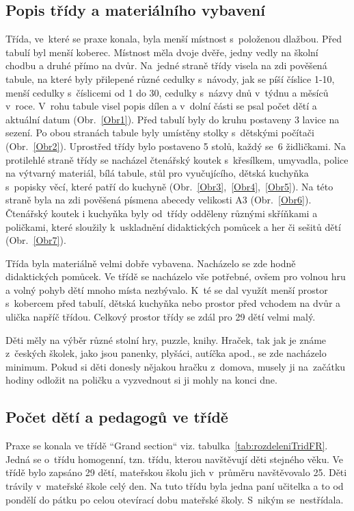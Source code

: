 		\subsection{Popis třídy a materiálního vybavení}
		\label{tridaVybaveni}
			Třída, ve které se praxe konala, byla menší místnost s~položenou dlažbou. Před tabulí byl menší koberec. Místnost měla dvoje dvěře, jedny vedly na školní chodbu a druhé přímo na dvůr.
			Na jedné straně třídy visela na zdi pověšená tabule, na které byly přilepené různé cedulky s návody, jak se píší číslice 1-10, menší cedulky s~číslicemi od 1 do 30, cedulky s~názvy dnů v týdnu a měsíců v~roce. V~rohu tabule visel popis dílen a v~dolní části se psal počet dětí a aktuální datum (Obr.~\ref{Obr1}). Před tabulí byly do kruhu postaveny 3 lavice na sezení. Po obou stranách tabule byly umístěny stolky s dětskými počítači (Obr.~\ref{Obr2}). Uprostřed třídy bylo postaveno 5 stolů, každý se 6 židličkami. Na protilehlé straně třídy se nacházel čtenářský koutek s křesílkem, umyvadla, police na výtvarný materiál, bílá tabule, stůl pro vyučujícího, dětská kuchyňka s popisky věcí, které patří do kuchyně (Obr.~\ref{Obr3},~\ref{Obr4},~\ref{Obr5}). Na této straně byla na zdi pověšená písmena abecedy velikosti A3 (Obr.~\ref{Obr6}). Čtenářský koutek i kuchyňka byly od třídy odděleny různými skříňkami a poličkami, které sloužily k uskladnění didaktických pomůcek a her či sešitů dětí (Obr.~\ref{Obr7}).

			Třída byla materiálně velmi dobře vybavena. Nacházelo se zde hodně didaktických pomůcek. Ve třídě se nacházelo vše potřebné, ovšem pro volnou hru a volný pohyb dětí mnoho místa nezbývalo. K~té se dal využít menší prostor s kobercem před tabulí, dětská kuchyňka nebo prostor před vchodem na dvůr a ulička napříč třídou. Celkový prostor třídy se zdál pro 29 dětí velmi malý.

			Děti měly na výběr různé stolní hry, puzzle, knihy. Hraček, tak jak je známe z~českých školek, jako jsou panenky, plyšáci, autíčka apod., se zde nacházelo minimum. Pokud si děti donesly nějakou hračku z~domova, musely ji na začátku hodiny odložit na poličku a vyzvednout si ji mohly na konci dne. 

		\subsection{Počet dětí a pedagogů ve třídě}
		\label{trida}

			Praxe se konala ve třídě “Grand section“ viz. tabulka~\ref{tab:rozdeleniTridFR}. Jedná se o~třídu homogenní, tzn. třídu, kterou navštěvují děti stejného věku. Ve třídě bylo zapsáno 29 dětí, mateřskou školu jich v průměru navštěvovalo 25. Děti trávily v mateřské škole celý den. Na tuto třídu byla jedna paní učitelka a to od pondělí do pátku po celou otevírací dobu mateřské školy. S nikým se nestřídala. 

